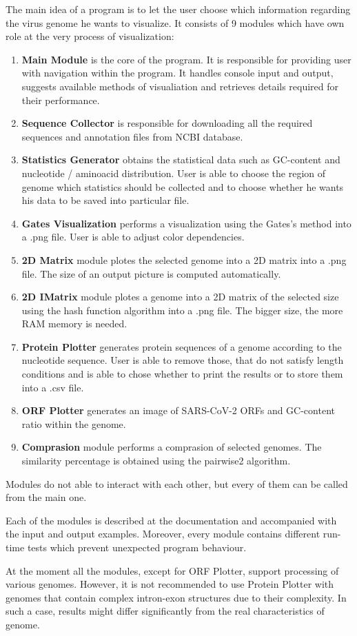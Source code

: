 The main idea of a program is to let the user choose which information regarding the virus genome he wants to visualize.
It consists of 9 modules which have own role at the very process of visualization:
\begin{enumerate}
    \item \textbf{Main Module} is the core of the program. It is responsible for providing user with navigation within the program.
    It handles console input and output, suggests available methods of visualiation and retrieves details required for their performance.
    \item \textbf{Sequence Collector} is responsible for downloading all the required sequences and annotation files from NCBI database.
    \item \textbf{Statistics Generator} obtains the statistical data such as GC-content and nucleotide / aminoacid distribution.
    User is able to choose the region of genome which statistics should be collected and to choose whether he wants his data to be saved into particular file.
    \item \textbf{Gates Visualization} performs a visualization using the Gates's method into a .png file.
    User is able to adjust color dependencies.
    \item \textbf{2D Matrix} module plotes the selected genome into a 2D matrix into a .png file.
    The size of an output picture is computed automatically.
    \item \textbf{2D IMatrix} module plotes a genome into a 2D matrix of the selected size using the hash function algorithm into a .png file.
    The bigger size, the more RAM memory is needed.
    \item \textbf{Protein Plotter} generates protein sequences of a genome according to the nucleotide sequence.
    User is able to remove those, that do not satisfy length conditions and is able to chose whether to print the results or to store them into a .csv file.
    \item \textbf{ORF Plotter} generates an image of SARS-CoV-2 ORFs and GC-content ratio within the genome.
    \item \textbf{Comprasion} module performs a comprasion of selected genomes.
    The similarity percentage is obtained using the pairwise2 algorithm.
\end{enumerate}

Modules do not able to interact with each other, but every of them can be called from the main one.

Each of the modules is described at the documentation and accompanied with the input and output examples.
Moreover, every module contains different run-time tests which prevent unexpected program behaviour.

At the moment all the modules, except for ORF Plotter, support processing of various genomes.
However, it is not recommended to use Protein Plotter with genomes that contain complex intron-exon structures due to their complexity.
In such a case, results might differ significantly from the real characteristics of genome.